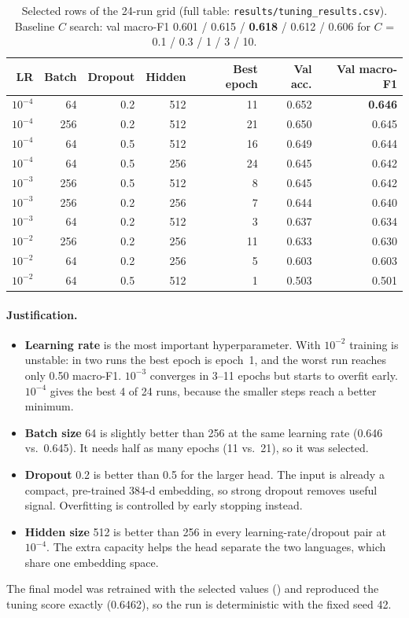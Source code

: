 \documentclass[11pt,a4paper]{article}
\begin{document}
\begin{table}[H]
\centering
\small
\begin{tabular}{rrrrrrr}
\toprule
\textbf{LR} & \textbf{Batch} & \textbf{Dropout} & \textbf{Hidden} & \textbf{Best epoch} & \textbf{Val acc.} & \textbf{Val macro-F1} \\
\midrule
$10^{-4}$ & 64  & 0.2 & 512 & 11 & 0.652 & \textbf{0.646} \\
$10^{-4}$ & 256 & 0.2 & 512 & 21 & 0.650 & 0.645 \\
$10^{-4}$ & 64  & 0.5 & 512 & 16 & 0.649 & 0.644 \\
$10^{-4}$ & 64  & 0.5 & 256 & 24 & 0.645 & 0.642 \\
$10^{-3}$ & 256 & 0.5 & 512 & 8  & 0.645 & 0.642 \\
$10^{-3}$ & 256 & 0.2 & 256 & 7  & 0.644 & 0.640 \\
$10^{-3}$ & 64  & 0.2 & 512 & 3  & 0.637 & 0.634 \\
$10^{-2}$ & 256 & 0.2 & 256 & 11 & 0.633 & 0.630 \\
$10^{-2}$ & 64  & 0.2 & 256 & 5  & 0.603 & 0.603 \\
$10^{-2}$ & 64  & 0.5 & 512 & 1  & 0.503 & 0.501 \\
\bottomrule
\end{tabular}
\caption{Selected rows of the 24-run grid (full table: \texttt{results/tuning\_results.csv}).
Baseline $C$ search: val macro-F1 0.601 / 0.615 / \textbf{0.618} / 0.612 / 0.606 for
$C$ = 0.1 / 0.3 / 1 / 3 / 10.}
\label{tab:tuning}
\end{table}

\paragraph{Justification.}
\begin{itemize}
  \item \textbf{Learning rate} is the most important hyperparameter. With $10^{-2}$ training is
        unstable: in two runs the best epoch is epoch~1, and the worst run reaches only 0.50
        macro-F1.
        $10^{-3}$ converges in 3--11 epochs but starts to overfit early. $10^{-4}$ gives
        the best 4 of 24 runs, because the smaller steps reach a better minimum.
  \item \textbf{Batch size} 64 is slightly better than 256 at the same learning rate (0.646 vs.\
        0.645). It needs half as many epochs (11 vs.\ 21), so it was selected.
  \item \textbf{Dropout} 0.2 is better than 0.5 for the larger head. The input is already a
        compact, pre-trained 384-d embedding, so strong dropout removes useful signal.
        Overfitting is controlled by early stopping instead.
  \item \textbf{Hidden size} 512 is better than 256 in every learning-rate/dropout pair at
        $10^{-4}$. The extra capacity helps the head separate the two languages, which share
        one embedding space.
\end{itemize}
The final model was retrained with the selected values () and reproduced the
tuning score exactly (0.6462), so the run is deterministic with the fixed seed 42.
\end{document}
